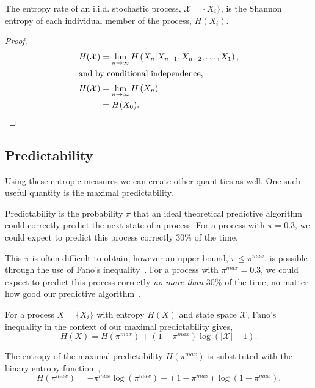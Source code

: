 \begin{lemma}
	The entropy rate of an i.i.d. stochastic process, $\mathcal{X}= \{ X_i \}$, is the Shannon entropy of each individual member of the process, $H(X_i)$.
\end{lemma}

\begin{proof}\label{proof:iidentroptrate}
\begin{align}
H(\mathcal{X})&=\lim _{n \rightarrow \infty} H\left(X_{n} | X_{n-1}, X_{n-2}, \ldots, X_{1}\right), \\
\intertext{and by conditional independence,}
H(\mathcal{X}) &=\lim _{n \rightarrow \infty} H\left(X_{n} \right) \nonumber \\
&= H(X_0).
\end{align}
\end{proof}

\subsection{Predictability}

Using these entropic measures we can create other quantities as well. One such useful quantity is the maximal predictability.

Predictability is the probability $\pi$ that an ideal theoretical predictive algorithm could correctly predict the next state of a process. For a process with $\pi = 0.3$, we could expect to predict this process correctly 30\% of the time. 

This $\pi$ is often difficult to obtain, however an upper bound, $\pi \leq \pi^{max}$, is possible through the use of Fano's inequality~\cite{fano_transmission_1961}.  For a process with $\pi^{max} = 0.3$, we could expect to predict this process correctly \emph{no more than} 30\% of the time, no matter how good our predictive algorithm~\cite{song_limits_2010}.


\begin{definition}\label{def:maximialpredictability}
For a process $X = \{ X_i \}$ with entropy $H(X)$ and state space $\mathcal{X}$, Fano's inequality in the context of our maximal predictability gives,
\begin{equation}
H(X) = H(\pi^{max}) + (1 - \pi^{max}) \log (|\mathcal{X}| - 1).
\end{equation}
\end{definition}

The entropy of the maximal predictability $H(\pi^{max})$ is substituted with the binary entropy function~\cite{song_limits_2010},   
\begin{equation}
H(\pi^{max}) = -\pi^{max} \log(\pi^{max}) - (1 -  \pi^{max}) \log(1 - \pi^{max}).
\end{equation}

